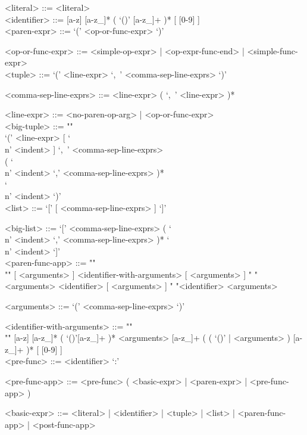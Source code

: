 \documentclass{article}
\begin{document}
\begin{grammar}

<literal> ::= <literal> \\

<identifier> ::= [a-z] [a-z_]* ( `()' [a-z_]+ )* [ [0-9] ] \\

<paren-expr> ::= `(' <op-or-func-expr> `)'  

<op-or-func-expr> ::=
<simple-op-expr> | <op-expr-func-end> | <simple-func-expr>  \\

<tuple> ::= `(' <line-expr> `,\ ' <comma-sep-line-exprs> `)'

<comma-sep-line-exprs> ::= <line-expr> ( `,\ ' <line-expr> )*

<line-expr> ::= <no-paren-op-arg> | <op-or-func-expr> \\

<big-tuple> ::= ""\\
`(' <line-expr> [ `\\n' <indent> ] `,\ ' <comma-sep-line-exprs> \\
( `\\n' <indent> `,' <comma-sep-line-exprs> )* \\
`\\n' <indent> `)' \\

<list> ::= `[' [ <comma-sep-line-exprs> ] `]'

<big-list> ::= 
`[' <comma-sep-line-exprs>
( `\\n' <indent> `,' <comma-sep-line-exprs> )*
`\\n' <indent> `]' \\

<paren-func-app> ::= ""\\""
[ <arguments> ] <identifier-with-arguments> [ <arguments> ]
\alt " "<arguments> <identifier> [ <arguments> ]
\alt " "<identifier> <arguments>

<arguments> ::= `(' <comma-sep-line-exprs> `)'

<identifier-with-arguments> ::= ""\\""
[a-z] [a-z_]* ( `()'[a-z_]+ )* <arguments>
[a-z_]+ ( ( `()' | <arguments> ) [a-z_]+ )* 
[ [0-9] ] \\

<pre-func> ::= <identifier> `:'

<pre-func-app> ::= <pre-func> ( <basic-expr> | <paren-expr> | <pre-func-app> )

<basic-expr> ::=
<literal> | <identifier> | <tuple> | <list> | <paren-func-app> | <post-func-app> \\


\end{grammar}
\end{document}
